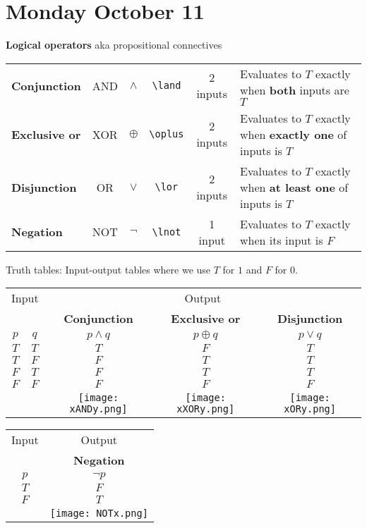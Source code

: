 \documentclass[12pt, oneside]{article}
\begin{document}
\begin{flushright}
\end{flushright} 
\section*{Monday October 11}


{\bf Logical operators} aka propositional connectives

\begin{tabular}{lccccp{4in}}
{\bf Conjunction} & AND & $\land$ &\verb|\land| & 2 inputs & Evaluates to $T$ exactly when {\bf both} inputs are $T$\\
{\bf Exclusive or} & XOR & $\oplus$ &\verb|\oplus| & 2 inputs & Evaluates to $T$ exactly when {\bf exactly one} of inputs is $T$\\
{\bf Disjunction} & OR & $\lor$ &\verb|\lor| & 2 inputs & Evaluates to $T$ exactly when {\bf at least one} of inputs is $T$\\
{\bf Negation} & NOT & $\lnot$ &\verb|\lnot| & 1 input & Evaluates to $T$ exactly when its input is $F$\\
\end{tabular} 

Truth tables: Input-output tables where we use $T$ for $1$ and $F$ for $0$.

\begin{center}
\begin{tabular}{cc||c|c|c}
\multicolumn{2}{c||}{Input}  & \multicolumn{3}{c}{Output} \\
& & {\bf Conjunction} &  {\bf Exclusive or} & {\bf Disjunction} \\
$p$ & $q$ & $p \land q$ &  $p  \oplus  q$ & $p \lor  q$ \\
\hline
$T$ & $T$ & $T$ & $F$ & $T$\\
$T$ & $F$ & $F$ & $T$ & $T$\\
$F$ & $T$ & $F$ & $T$ & $T$\\
$F$ & $F$ & $F$ & $F$ & $F$\\
\hline
& & \texttt{[image: xANDy.png]}
&  \texttt{[image: xXORy.png]}
&  \texttt{[image: xORy.png]}
\end{tabular}
\qquad \qquad\qquad
\begin{tabular}{c||c}
Input & Output \\
& {\bf Negation} \\
$p$ & $\lnot p$ \\
\hline
$T$ & $F$ \\
$F$ & $T$\\
\hline & \texttt{[image: NOTx.png]}
\end{tabular}
\end{center}
 
\end{document}
